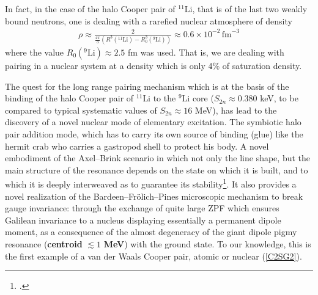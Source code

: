 \begin{subappendices}
In fact, in the case of the halo Cooper pair of $^{11}$Li, that is of the last two weakly bound neutrons, one is dealing with a rarefied nuclear atmosphere of density
\begin{align}\label{eq5App3E}
\rho\approx\frac{2}{\frac{4\pi}{3}(R^3(^{11}\text{Li})-R_0^3(^{9}\text{Li}))}\approx 0.6\times 10^{-2}\,\text{fm}^{-3}
\end{align}
where the value $R_0(^9\text{Li})\approx 2.5$ fm was used. That is, we are dealing with pairing in a nuclear system at a density which is only 4\% of saturation density.

The quest for the long range pairing mechanism which is at the basis of the binding of the halo Cooper pair of $^{11}$Li to the $^9$Li core ($S_{2n}\approx0.380$ keV, to be compared to typical systematic values of $S_{2n}\approx 16$ MeV), has lead to the discovery of a novel nuclear mode of elementary excitation. The symbiotic halo pair addition mode, which has to carry its own source of binding (glue) like the hermit crab who carries a gastropod shell to protect his body. A novel embodiment of the Axel--Brink scenario in which not only the line shape, but the main structure of the resonance depends on the state on which it is built, and to which it is deeply interweaved as to guarantee its stability\footnote{\cite{Axel:62,Brink:55}.}. It also provides a novel realization of the Bardeen--Fr\"olich--Pines microscopic mechanism to break gauge invariance: through the exchange of quite large ZPF which ensures Galilean invariance to a nucleus displaying essentially a permanent dipole moment, as a consequence of the almost degeneracy of the giant dipole pigmy resonance (\textbf{centroid} $\lesssim 1$ \textbf{MeV}) with the ground state. To our knowledge, this is the first example of a van der Waals Cooper pair, atomic or nuclear (\ref{C2SG2}).



\end{subappendices}
